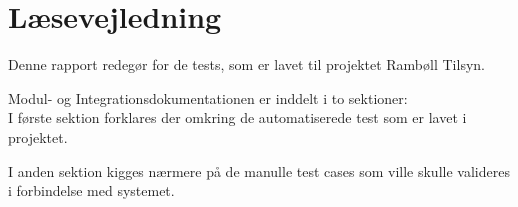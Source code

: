 \chapter*{Læsevejledning}
Denne rapport redegør for de tests, som er lavet til projektet Rambøll Tilsyn. 

Modul- og Integrationsdokumentationen er inddelt i to sektioner:\\
I første sektion forklares der omkring de automatiserede test som er lavet i projektet.

I anden sektion kigges nærmere på de manulle test cases som ville skulle valideres i forbindelse med systemet.